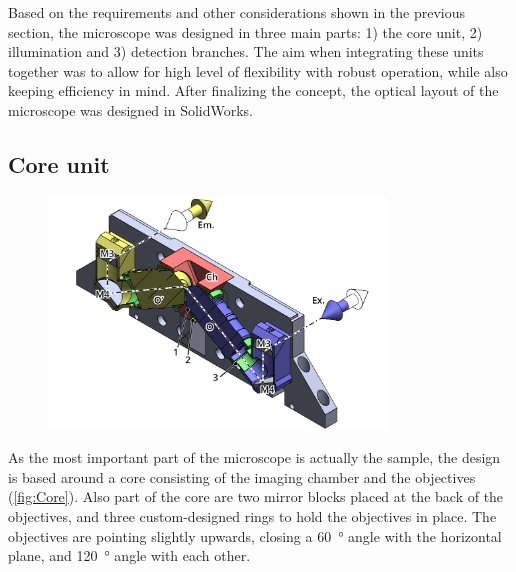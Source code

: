   Based on the requirements and other considerations shown in the previous section, the microscope was designed in three main parts: 1) the core unit, 2) illumination and 3) detection branches. The aim when integrating these units together was to allow for high level of flexibility with robust operation, while also keeping efficiency in mind. After finalizing the concept, the optical layout of the microscope was designed in SolidWorks.



  \subsection{Core unit}
  \label{sec:core}
    \begin{figure}
      \centering
      \includegraphics[width=0.8\textwidth]{SW/frontRender.png}
      \label{fig:Core}
    \end{figure}

    As the most important part of the microscope is actually the sample, the design is based around a core consisting of the imaging chamber and the objectives (\autoref{fig:Core}). Also part of the core are two mirror blocks placed at the back of the objectives, and three custom-designed rings to hold the objectives in place. The objectives are pointing slightly upwards, closing a \SI{60}{\degree} angle with the horizontal plane, and \SI{120}{\degree} angle with each other. 

